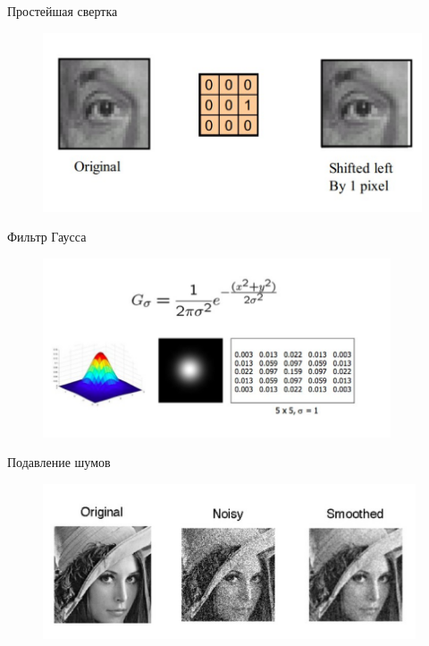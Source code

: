 \documentclass[10pt]{beamer}
\begin{document}
\begin{frame}{Простейшая свертка}
	\begin{figure}[htbp]
	  \includegraphics[height=150pt, keepaspectratio = true]{images/conv_easy4}   
	\end{figure}
\end{frame}

\begin{frame}{Фильтр Гаусса}
	\begin{figure}[htbp]
	  \includegraphics[height=150pt, keepaspectratio = true]{images/gauss}   
	\end{figure}
\end{frame}

\begin{frame}{Подавление шумов}
	\begin{figure}[htbp]
	  \includegraphics[height=130pt, keepaspectratio = true]{images/gauss2}   
	\end{figure}
\end{frame}
\end{document}
